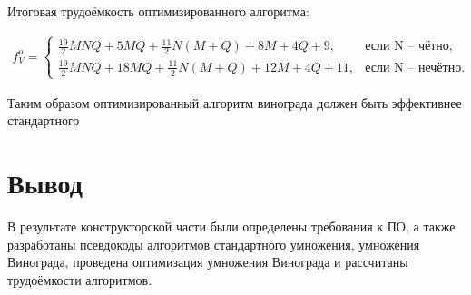 Итоговая трудоёмкость оптимизированного алгоритма:

\begin{equation}
	\label{eq:ovin}
	\begin{matrix}
		f^o_{V} = \begin{cases}
			\frac{19}{2}MNQ + 5MQ + \frac{11}{2}N(M+Q) + 8M + 4Q + 9, &\text{если N – чётно}, \\
			\frac{19}{2}MNQ + 18MQ + \frac{11}{2}N(M+Q) + 12M + 4Q + 11, &\text{если N – нечётно}.
		\end{cases}
	\end{matrix}
\end{equation}

Таким образом оптимизированный алгоритм винограда должен быть эффективнее стандартного

\section{Вывод}

В результате конструкторской части были определены требования к ПО, а также разработаны псевдокоды алгоритмов стандартного умножения, умножения Винограда, проведена оптимизация умножения Винограда и рассчитаны трудоёмкости алгоритмов.

\clearpage
